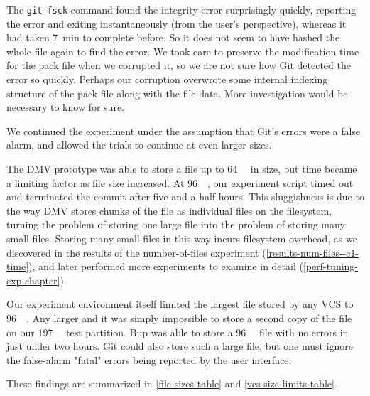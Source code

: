 The \lstinline{git fsck} command found the integrity error surprisingly quickly,
reporting the error and exiting instantaneously (from the user's perspective),
whereas it had taken \SI{7}{\minute} to complete before. So it does not seem to
have hashed the whole file again to find the error. We took care to preserve the
modification time for the pack file when we corrupted it, so we are not sure how
Git detected the error so quickly. Perhaps our corruption overwrote some
internal indexing structure of the pack file along with the file data. More
investigation would be necessary to know for sure.

We continued the experiment under the assumption that Git's errors were a false
alarm, and allowed the trials to continue at even larger sizes.

The \gls{DMV} prototype was able to store a file up to \SI{64}{\gibi\byte} in
size, but time became a limiting factor as file size increased. At
\SI{96}{\gibi\byte}, our experiment script timed out and terminated the
\gls{commit} after five and a half hours. This sluggishness is due to the way
DMV stores chunks of the file as individual files on the filesystem, turning the
problem of storing one large file into the problem of storing many small files.
Storing many small files in this way incurs filesystem overhead, as we
discovered in the results of the number-of-files experiment
(\autoref{results-num-files--c1-time}), and later performed more experiments to
examine in detail (\autoref{perf-tuning-exp-chapter}).

Our experiment environment itself limited the largest file stored by any
\gls{VCS} to \SI{96}{\gibi\byte}. Any larger and it was simply impossible to
store a second copy of the file on our \SI{197}{\gibi\byte} test partition. Bup
was able to store a \SI{96}{\gibi\byte} file with no errors in just under two
hours. Git could also store such a large file, but one must ignore the
false-alarm "fatal" errors being reported by the user interface.

These findings are summarized in \autoref{file-sizes-table} and
\autoref{vcs-size-limits-table}.

